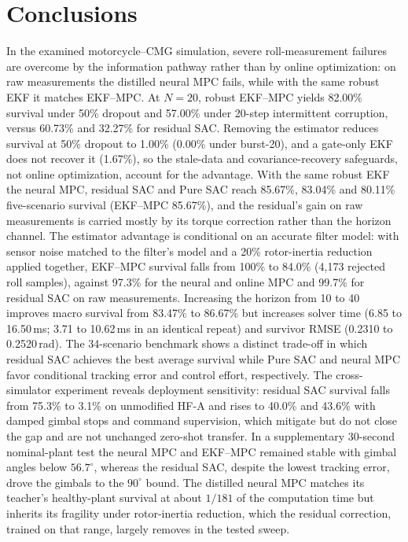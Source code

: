 \documentclass[preprint,12pt,authoryear=false]{elsarticle}
\theoremstyle{remark}\newtheorem{remark}{Remark}
\theoremstyle{plain}\newtheorem{proposition}{Proposition}\newtheorem{lemma}{Lemma}
\theoremstyle{definition}\newtheorem{assumption}{Assumption}
\begin{document}
\section{Conclusions}
In the examined motorcycle--CMG simulation, severe roll-measurement failures are overcome by the information pathway rather than by online optimization: on raw measurements the distilled neural MPC fails, while with the same robust EKF it matches EKF--MPC. At $N=20$, robust EKF--MPC yields 82.00\% survival under 50\% dropout and 57.00\% under 20-step intermittent corruption, versus 60.73\% and 32.27\% for residual SAC. Removing the estimator reduces survival at 50\% dropout to 1.00\% (0.00\% under burst-20), and a gate-only EKF does not recover it (1.67\%), so the stale-data and covariance-recovery safeguards, not online optimization, account for the advantage. With the same robust EKF the neural MPC, residual SAC and Pure SAC reach 85.67\%, 83.04\% and 80.11\% five-scenario survival (EKF--MPC 85.67\%), and the residual's gain on raw measurements is carried mostly by its torque correction rather than the horizon channel. The estimator advantage is conditional on an accurate filter model: with sensor noise matched to the filter's model and a 20\% rotor-inertia reduction applied together, EKF--MPC survival falls from 100\% to 84.0\% (4{,}173 rejected roll samples), against 97.3\% for the neural and online MPC and 99.7\% for residual SAC on raw measurements. Increasing the horizon from 10 to 40 improves macro survival from 83.47\% to 86.67\% but increases solver time (6.85 to 16.50\,ms; 3.71 to 10.62\,ms in an identical repeat) and survivor RMSE (0.2310 to 0.2520\,rad). The 34-scenario benchmark shows a distinct trade-off in which residual SAC achieves the best average survival while Pure SAC and neural MPC favor conditional tracking error and control effort, respectively. The cross-simulator experiment reveals deployment sensitivity: residual SAC survival falls from 75.3\% to 3.1\% on unmodified HF-A and rises to 40.0\% and 43.6\% with damped gimbal stops and command supervision, which mitigate but do not close the gap and are not unchanged zero-shot transfer. In a supplementary 30-second nominal-plant test the neural MPC and EKF--MPC remained stable with gimbal angles below $56.7^\circ$, whereas the residual SAC, despite the lowest tracking error, drove the gimbals to the $90^\circ$ bound. The distilled neural MPC matches its teacher's healthy-plant survival at about $1/181$ of the computation time but inherits its fragility under rotor-inertia reduction, which the residual correction, trained on that range, largely removes in the tested sweep.
\end{document}

